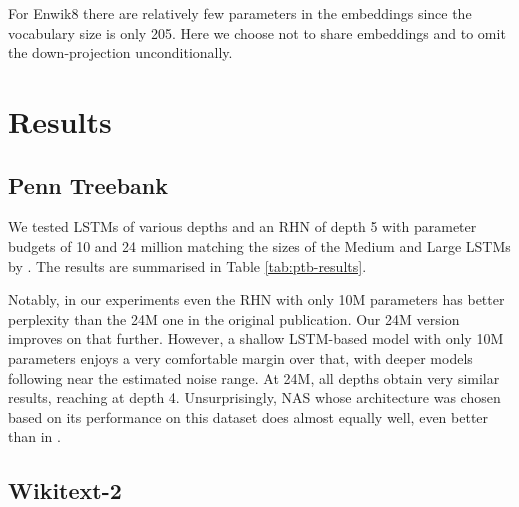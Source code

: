 \documentclass[letter]{article} \usepackage{iclr2018_conference,times}
\newcommand{\enwik}{Enwik8\xspace}
\newcommand{\nlltoppl}[1]{\pgfmathparse{exp(#1)}\pgfmathprintnumber[fixed,zerofill,precision=1]{\pgfmathresult}}
\begin{document}
For \enwik there are relatively few parameters in the embeddings since
the vocabulary size is only 205. Here we choose not to share
embeddings and to omit the down-projection unconditionally.

\section{Results}

\subsection{Penn Treebank}

We tested LSTMs of various depths and an RHN of depth 5 with parameter
budgets of 10 and 24 million matching the sizes of the Medium and
Large LSTMs by \citep{DBLP:journals/corr/ZarembaSV14}. The results are
summarised in Table \ref{tab:ptb-results}.

Notably, in our experiments even the RHN with only 10M parameters has
better perplexity than the 24M one in the original publication. Our
24M version improves on that further. However, a shallow LSTM-based
model with only 10M parameters enjoys a very comfortable margin over
that, with deeper models following near the estimated noise range. At
24M, all depths obtain very similar results, reaching \nlltoppl{4.065}
at depth 4. Unsurprisingly, NAS whose architecture was chosen based on
its performance on this dataset does almost equally well, even better
than in \citet{zoph2016neural}.

\subsection{Wikitext-2}
\end{document}
